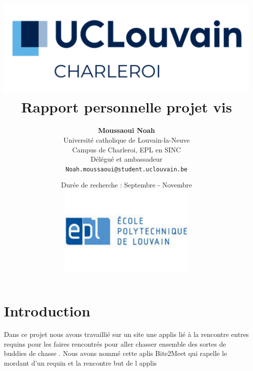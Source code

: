\documentclass{article}
\title{
    \includegraphics[width=1\textwidth]{photo/UCLouvain_Charleroi.png} \\
    \vspace{1.5cm}
    {\Huge \textbf{Rapport personnelle projet vis}} \\
    \vspace{1.5cm}
}
\author{
    \textbf{Moussaoui Noah} \\
    Université catholique de Louvain-la-Neuve \\
    Campus de Charleroi, EPL en SINC \\
    Délégué et ambassadeur \\
    \texttt{Noah.moussaoui@student.uclouvain.be}
}
\date{
    \vspace{1.5cm}
    Durée de recherche : Septembre - Novembre \\
     \vspace{1.5cm}
    \includegraphics[width=0.5\textwidth]{photo/EPL.jpeg}
}
\begin{document}
\maketitle
\newpage
\section{Introduction}
Dans ce projet nous avons travaillié sur un site une applis lié à la rencontre entres requins pour les faires rencontrés pour aller chasser ensemble  des sortes de buddies de chasse . Nous avons nommé cette aplis Bite2Meet qui rapelle le mordant d'un requin et  la rencontre but de l applis 
\end{document}
